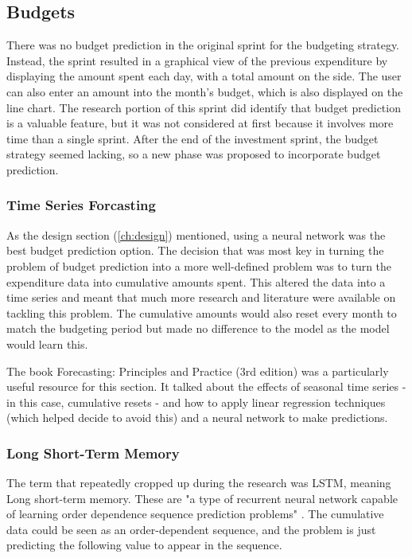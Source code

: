 \subsection{Budgets}
There was no budget prediction in the original sprint for the budgeting strategy. Instead, the sprint resulted in a graphical view of the previous expenditure by displaying the amount spent each day, with a total amount on the side. The user can also enter an amount into the month's budget, which is also displayed on the line chart. The research portion of this sprint did identify that budget prediction is a valuable feature, but it was not considered at first because it involves more time than a single sprint. After the end of the investment sprint, the budget strategy seemed lacking, so a new phase was proposed to incorporate budget prediction.

\subsubsection{Time Series Forcasting}
As the design section (\ref{ch:design}) mentioned, using a neural network was the best budget prediction option. The decision that was most key in turning the problem of budget prediction into a more well-defined problem was to turn the expenditure data into cumulative amounts spent. This altered the data into a time series and meant that much more research and literature were available on tackling this problem. The cumulative amounts would also reset every month to match the budgeting period but made no difference to the model as the model would learn this.

The book Forecasting: Principles and Practice (3rd edition) \cite{ForcastingPrinciplesPractice} was a particularly useful resource for this section. It talked about the effects of seasonal time series - in this case, cumulative resets - and how to apply linear regression techniques (which helped decide to avoid this) and a neural network to make predictions.

\subsubsection{Long Short-Term Memory}
The term that repeatedly cropped up during the research was LSTM, meaning Long short-term memory. These are "a type of recurrent neural network capable of learning order dependence sequence prediction problems" \cite{LSTMGentleIntro}. The cumulative data could be seen as an order-dependent sequence, and the problem is just predicting the following value to appear in the sequence.

